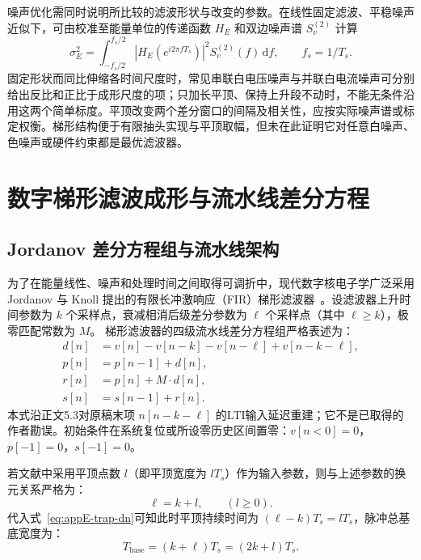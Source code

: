 噪声优化需同时说明所比较的滤波形状与改变的参数。在线性固定滤波、平稳噪声近似下，可由校准至能量单位的传递函数 $H_E$ 和双边噪声谱 $S_v^{(2)}$ 计算
\begin{equation}\label{eq:appE-noise-spectrum}
\sigma_E^2=\int_{-f_s/2}^{f_s/2}|H_E(e^{i2\pi fT_s})|^2S_v^{(2)}(f)\,\mathrm df,\qquad f_s=1/T_s.
\end{equation}
固定形状而同比伸缩各时间尺度时，常见串联白电压噪声与并联白电流噪声可分别给出反比和正比于成形尺度的项；只加长平顶、保持上升段不动时，不能无条件沿用这两个简单标度。平顶改变两个差分窗口的间隔及相关性，应按实际噪声谱或标定权衡。梯形结构便于有限抽头实现与平顶取幅，但未在此证明它对任意白噪声、色噪声或硬件约束都是最优滤波器。

\section{数字梯形滤波成形与流水线差分方程}\label{sec:appE-trapezoid}

\subsection{Jordanov 差分方程组与流水线架构}

为了在能量线性、噪声和处理时间之间取得可调折中，现代数字核电子学广泛采用 Jordanov 与 Knoll 提出的有限长冲激响应（FIR）梯形滤波器~\cite{wu-hongyi-2020-general-purpose-digital-daq-thesis}。设滤波器上升时间参数为 $k$ 个采样点，衰减相消后级差分参数为 $\ell$ 个采样点（其中 $\ell \ge k$），极零匹配常数为 $M$。
梯形滤波器的四级流水线差分方程组严格表述为：
\begin{align}
d[n] &= v[n] - v[n-k] - v[n-\ell] + v[n-k-\ell], \label{eq:appE-trap-dn} \\
p[n] &= p[n-1] + d[n], \label{eq:appE-trap-pn} \\
r[n] &= p[n] + M \cdot d[n], \label{eq:appE-trap-rn} \\
s[n] &= s[n-1] + r[n]. \label{eq:appE-trap-sn}
\end{align}
本式沿正文5.3对原稿末项 $n[n-k-\ell]$ 的LTI输入延迟重建；它不是已取得的作者勘误。初始条件在系统复位或所设零历史区间置零：$v[n < 0] = 0$，$p[-1] = 0$，$s[-1] = 0$。

若文献中采用平顶点数 $l$（即平顶宽度为 $l T_s$）作为输入参数，则与上述参数的换元关系严格为：
\begin{equation}\label{eq:appE-ell-subst}
\ell = k + l, \qquad (l \ge 0).
\end{equation}
代入式~\eqref{eq:appE-trap-dn}可知此时平顶持续时间为 $(\ell - k) T_s = l T_s$，脉冲总基底宽度为：
\begin{equation}\label{eq:appE-fir-length}
T_{\mathrm{base}} = (k + \ell) T_s = (2k + l) T_s.
\end{equation}


